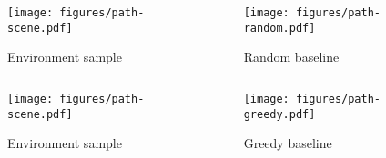 \begin{frame}
    \begin{columns}
        \begin{column}{0.55\textwidth}
            \begin{figure}
                \centering
                \texttt{[image: figures/path-scene.pdf]}
                \par Environment sample
            \end{figure}
        \end{column}
        \begin{column}{0.5\textwidth}
            \begin{figure}
                \centering
                \texttt{[image: figures/path-random.pdf]}
                \par Random baseline
            \end{figure}
        \end{column}
    \end{columns}
\end{frame}

\begin{frame}
    \begin{columns}
        \begin{column}{0.55\textwidth}
            \begin{figure}
                \centering
                \texttt{[image: figures/path-scene.pdf]}
                \par Environment sample
            \end{figure}
        \end{column}
        \begin{column}{0.5\textwidth}
            \begin{figure}
                \centering
                \texttt{[image: figures/path-greedy.pdf]}
                \par Greedy baseline
            \end{figure}
        \end{column}
    \end{columns}
\end{frame}

